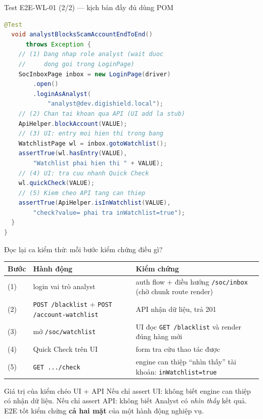 \documentclass[aspectratio=169,12pt]{beamer}
\begin{document}
\begin{frame}[fragile]{Test E2E-WL-01 (2/2) --- kịch bản đầy đủ dùng POM}
  \vspace*{-0.7em}
\begin{lstlisting}[language=Java,basicstyle=\ttfamily\scriptsize]
  @Test
  void analystBlocksScamAccountEndToEnd()
      throws Exception {
    // (1) Dang nhap role analyst (wait duoc
    //     dong goi trong LoginPage)
    SocInboxPage inbox = new LoginPage(driver)
        .open()
        .loginAsAnalyst(
            "analyst@dev.digishield.local");
    // (2) Chan tai khoan qua API (UI add la stub)
    ApiHelper.blockAccount(VALUE);
    // (3) UI: entry moi hien thi trong bang
    WatchlistPage wl = inbox.gotoWatchlist();
    assertTrue(wl.hasEntry(VALUE),
        "Watchlist phai hien thi " + VALUE);
    // (4) UI: tra cuu nhanh Quick Check
    wl.quickCheck(VALUE);
    // (5) Kiem cheo API tang can thiep
    assertTrue(ApiHelper.isInWatchlist(VALUE),
        "check?value= phai tra inWatchlist=true");
  }
}
\end{lstlisting}
\end{frame}

\begin{frame}{Đọc lại ca kiểm thử: mỗi bước kiểm chứng điều gì?}
  \vspace*{-0.8em}
  \begin{center}
  \footnotesize
  \begin{tabular}{p{0.9cm}p{4.6cm}p{5.6cm}}
    \toprule
    \textbf{Bước} & \textbf{Hành động} & \textbf{Kiểm chứng} \\
    \midrule
    (1) & login vai trò analyst & auth flow + điều hướng
      \texttt{/soc/inbox} (chờ chunk route render) \\
    (2) & \texttt{POST /blacklist} +
      \texttt{POST /account-watchlist} & API nhận dữ liệu, trả 201 \\
    (3) & mở \texttt{/soc/watchlist} & UI đọc \texttt{GET /blacklist}
      và render đúng hàng mới \\
    (4) & Quick Check trên UI & form tra cứu thao tác được \\
    (5) & \texttt{GET .../check} & engine can thiệp ``nhìn thấy''
      tài khoản: \texttt{inWatchlist=true} \\
    \bottomrule
  \end{tabular}
  \end{center}

  \begin{exampleblock}{Giá trị của kiểm chéo UI + API}
    Nếu chỉ assert UI: không biết engine can thiệp có nhận dữ liệu.
    Nếu chỉ assert API: không biết Analyst có \emph{nhìn thấy} kết quả.
    E2E tốt kiểm chứng \textbf{cả hai mặt} của một hành động nghiệp vụ.
  \end{exampleblock}
\end{frame}
\end{document}
